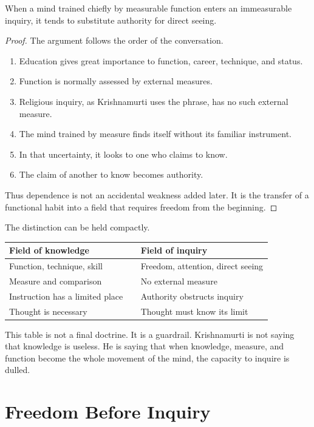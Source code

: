 \begin{proposition}
When a mind trained chiefly by measurable function enters an immeasurable inquiry, it tends to substitute authority for direct seeing.
\end{proposition}

\begin{proof}
The argument follows the order of the conversation.
\begin{enumerate}
\item Education gives great importance to function, career, technique, and status.
\item Function is normally assessed by external measures.
\item Religious inquiry, as Krishnamurti uses the phrase, has no such external measure.
\item The mind trained by measure finds itself without its familiar instrument.
\item In that uncertainty, it looks to one who claims to know.
\item The claim of another to know becomes authority.
\end{enumerate}
Thus dependence is not an accidental weakness added later. It is the transfer of a functional habit into a field that requires freedom from the beginning.
\end{proof}

The distinction can be held compactly.

\begin{table}
\centering
\begin{tabular}{p{0.43\linewidth} p{0.43\linewidth}}
Field of knowledge & Field of inquiry \\
\hline
Function, technique, skill & Freedom, attention, direct seeing \\
Measure and comparison & No external measure \\
Instruction has a limited place & Authority obstructs inquiry \\
Thought is necessary & Thought must know its limit \\
\end{tabular}
\end{table}

This table is not a final doctrine. It is a guardrail. Krishnamurti is not saying that knowledge is useless. He is saying that when knowledge, measure, and function become the whole movement of the mind, the capacity to inquire is dulled.

\section{Freedom Before Inquiry}

